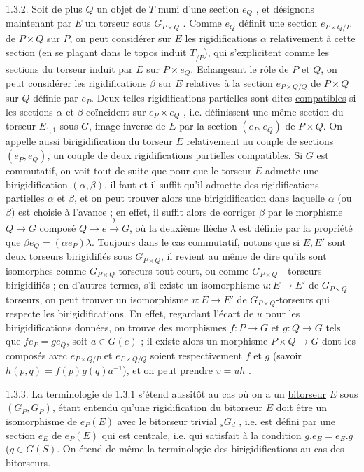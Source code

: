 1.3.2.  Soit de plus $Q$ un objet de \underline{$T$} muni d'une section $e_Q$ , et désignons maintenant par $E$ un torseur sous $G_{P\times Q}$ . Comme $e_Q$ définit une section $e_{P\times Q/P}$ de $P\times Q$ sur $P$, on peut considérer sur $E$ les rigidifications $\alpha$ relativement à cette section (en se plaçant dans le topos induit $\underline{T}_{/P}$), qui s'explicitent comme les sections du torseur induit par $E$ sur $P\times e_Q$. Echangeant le rôle de $P$ et $Q$, on peut considérer les rigidifications $\beta$ sur $E$ relatives à la section $e_{P\times Q/Q}$ de $P\times Q$ sur $Q$ définie par $e_P$. Deux telles rigidifications partielles sont dites \underline{compatibles} si les sections $\alpha$ et $\beta$ coïncident sur $e_P\times e_Q$ , i.e. définissent une même section du torseur $E_{1,1}$ sous $G$, image
inverse de $E$ par la section $(e_P,e_Q)$ de $P\times Q$. On appelle aussi \underline{birigidification} du torseur $E$ relativement au couple de sections $(e_P,e_Q)$, un couple de deux rigidifications partielles compatibles. Si $G$ est commutatif, on voit tout de suite que pour que le torseur $E$ admette une birigidification $(\alpha,\beta)$, il faut et il suffit qu'il admette des rigidifications partielles $\alpha$ et $\beta$, et on peut trouver alors une birigidification dans laquelle $\alpha$ (ou $\beta$) est choisie à l'avance ; en effet, il suffit alors de corriger $\beta$ par le morphisme $Q \longrightarrow G$ composé $Q \longrightarrow e \xrightarrow{\lambda} G$, où la deuxième flèche $\lambda$ est définie par la propriété que $\beta e_Q = (\alpha e_P)\lambda$. Toujours dans le cas commutatif, notons que si $E,E'$ sont deux torseurs birigidifiés sous $G_{P\times Q}$, il revient au même de dire qu'ils sont isomorphes comme $G_{P\times Q}$-torseurs tout court, ou comme $G_{P\times Q}$ - torseurs birigidifiés ; en d'autres termes, s'il existe un isomorphisme $u : E \longrightarrow E'$ de $G_{P\times Q}$-torseurs, on peut trouver un isomorphisme $v : E \longrightarrow E'$ de $G_{P\times Q}$-torseurs qui respecte les birigidifications. En effet, regardant l'écart de $u$ pour les birigidifications données, on trouve des morphismes $f:P \longrightarrow G$ et $g : Q \longrightarrow G$ tels que $fe_P=ge_Q$, soit $a \in G(e)$ ; il existe alors un morphisme $P\times Q \longrightarrow G$ dont les composés avec $e_{P\times Q/P}$ et $e_{P\times Q/Q}$ soient respectivement $f$ et $g$ (savoir $h(p,q) = f(p)g(q)a^{-1}$), et on peut prendre $v = uh$ .

1.3.3.  La terminologie de 1.3.1 s'étend aussitôt au cas où on a un \underline{bitorseur} $E$ sous $(G_P,G_P)$, étant entendu qu'une rigidification du bitorseur $E$ doit être un isomorphisme de $e_P(E)$ avec le bitorseur trivial $_sG_d$ , i.e. est défini par une section $e_E$ de $e_P(E)$ qui est \underline{centrale}, i.e. qui satisfait à la condition $g.e_E = e_E.g$ ($g \in G(S)$. On étend de même la terminologie des
birigidifications au cas des bitorseurs.

